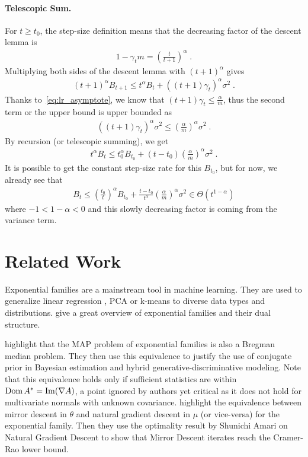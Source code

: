 \documentclass{article}
\newcommand{\logpart}{A}
\newcommand{\conj}{\logpart^*}
\newcommand{\natp}{\theta}
\newcommand{\meanp}{\mu}
\newcommand{\lr}{\gamma} %
\begin{document}
\paragraph{Telescopic Sum.}
For $t \geq t_0$, the step-size definition means that the decreasing factor of the descent lemma is
\begin{align}
	1- \lr_t m = \left(\frac{t}{t+1} \right)^\alpha  \; .
\end{align}
Multiplying both sides of the descent lemma with $(t+1)^\alpha$ gives
\begin{align}
	(t+1)^\alpha B_{t+1} 
	\leq t^\alpha B_t + ((t+1)\lr_t)^\alpha \sigma^2 \; .
\end{align}
Thanks to~\eqref{eq:lr_asymptote}, we know that $(t+1)\lr_t \leq \frac{\alpha}{m}$, thus the second term or the upper bound is upper bounded as
\begin{align}
	((t+1)\lr_t)^\alpha \sigma^2  
	\leq \left(\frac{\alpha}{m} \right)^\alpha  \sigma^2 \; .
\end{align}
By recursion (or telescopic summing), we get
\begin{align}
	t^\alpha B_t \leq t_0^\alpha B_{t_0} 
	+ (t - t_0) \left(\frac{\alpha}{m} \right)^\alpha  \sigma^2  \; .
\end{align}
It is possible to get the constant step-size rate for this $B_{t_0}$, but for now, we already see that
\begin{align}
	B_t \leq \left(\frac{t_0}{t} \right)^\alpha B_{t_0} 
	+ \frac{t - t_0}{t^\alpha} \left(\frac{\alpha}{m} \right)^\alpha  \sigma^2 \in \Theta(t^{1-\alpha}) 
\end{align}
where $-1 <1-\alpha < 0$ and this slowly decreasing factor is coming from the variance term.



\section{Related Work}
Exponential families are a mainstream tool in machine learning. They are used  to generalize linear regression \citep{mccullagh1989generalized}, PCA \citep{collins2001generalization} or k-means \citep{banerjee2005clustering} to diverse data types and distributions.
\citet[Chapter 3]{wainwright2008graphical} give a great overview of exponential families and their dual structure. 

\citet{agarwal2010geometric} highlight that the MAP problem of exponential families is also a Bregman median problem. They then use this equivalence to justify the use of conjugate prior in Bayesian estimation and hybrid generative-discriminative modeling.
Note that this equivalence holds only if sufficient statistics are within $\dom \conj  = \mathrm{Im} (\nabla\logpart)$, a point ignored by authors yet critical as it does not hold for multivariate normals with unknown covariance. 
\citet{raskutti2015information} highlight the equivalence between mirror descent in $\natp$ and natural gradient descent in $\meanp$ (or vice-versa) for the exponential family. Then they use the optimality result by Shunichi Amari on Natural Gradient Descent to show that Mirror Descent iterates reach the Cramer-Rao lower bound.
\end{document}
